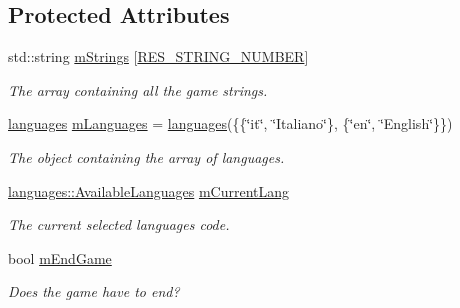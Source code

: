 \subsection*{Protected Attributes}
\begin{DoxyCompactItemize}
\item 
\mbox{\label{classgame_a5d2da7f031219641d99da18de74dffa0}} 
std\+::string \mbox{\hyperlink{classgame_a5d2da7f031219641d99da18de74dffa0}{m\+Strings}} \mbox{[}\mbox{\hyperlink{classgame_a750823afdadfbde9c945b9d0703c499da9fc16aaae3b7622481465a27e7908aa6}{R\+E\+S\+\_\+\+S\+T\+R\+I\+N\+G\+\_\+\+N\+U\+M\+B\+ER}}\mbox{]}
\begin{DoxyCompactList}\small\item\em The array containing all the game strings. \end{DoxyCompactList}\item 
\mbox{\label{classgame_ac4c8377dc422cb94c3761512d7afddac}} 
\mbox{\hyperlink{classgame_1_1languages}{languages}} \mbox{\hyperlink{classgame_ac4c8377dc422cb94c3761512d7afddac}{m\+Languages}} = \mbox{\hyperlink{classgame_1_1languages}{languages}}(\{\{\char`\"{}it\char`\"{}, \char`\"{}Italiano\char`\"{}\}, \{\char`\"{}en\char`\"{}, \char`\"{}English\char`\"{}\}\})
\begin{DoxyCompactList}\small\item\em The object containing the array of languages. \end{DoxyCompactList}\item 
\mbox{\label{classgame_a0ca92da64583b5e8b4fa03153fabf8b7}} 
\mbox{\hyperlink{classgame_1_1languages_ad965ce3a9fdce02ab3caba6301f221eb}{languages\+::\+Available\+Languages}} \mbox{\hyperlink{classgame_a0ca92da64583b5e8b4fa03153fabf8b7}{m\+Current\+Lang}}
\begin{DoxyCompactList}\small\item\em The current selected language\textquotesingle{}s code. \end{DoxyCompactList}\item 
\mbox{\label{classgame_a56f997f6d66853383a7766f859dbb14f}} 
bool \mbox{\hyperlink{classgame_a56f997f6d66853383a7766f859dbb14f}{m\+End\+Game}}
\begin{DoxyCompactList}\small\item\em Does the game have to end? \end{DoxyCompactList}\end{DoxyCompactItemize}
